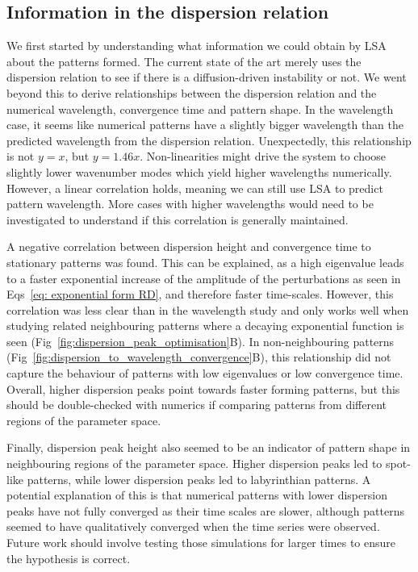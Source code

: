 \subsection*{Information in the dispersion relation}
We first started by understanding what information we could obtain by LSA about the patterns formed.
The current state of the art merely uses the dispersion relation to see if there is a diffusion-driven instability or not.
We went beyond this to derive relationships between the dispersion relation and the numerical wavelength, convergence time and pattern shape.
In the wavelength case, it seems like numerical patterns have a slightly bigger wavelength than the predicted wavelength from the dispersion relation.
Unexpectedly, this relationship is not $y=x$, but $y=1.46x$.
Non-linearities might drive the system to choose slightly lower wavenumber modes which yield higher wavelengths numerically.
However, a linear correlation holds, meaning we can still use LSA to predict pattern wavelength.
More cases with higher wavelengths would need to be investigated to understand if this correlation is generally maintained.

A negative correlation between dispersion height and convergence time to stationary patterns was found.
This can be explained, as a high eigenvalue leads to a faster exponential increase of the amplitude of the perturbations as seen in Eqs~\ref{eq: exponential form RD}, and therefore faster time-scales.
However, this correlation was less clear than in the wavelength study and only works well when studying related neighbouring patterns where a decaying exponential function is seen (Fig~\ref{fig:dispersion_peak_optimisation}B).
In non-neighbouring patterns (Fig~\ref{fig:dispersion_to_wavelength_convergence}B), this relationship did not capture the behaviour of patterns with low eigenvalues or low convergence time.
Overall, higher dispersion peaks point towards faster forming patterns, but this should be double-checked with numerics if comparing patterns from different regions of the parameter space.

Finally, dispersion peak height also seemed to be an indicator of pattern shape in neighbouring regions of the parameter space.
Higher dispersion peaks led to spot-like patterns, while lower dispersion peaks led to labyrinthian patterns.
A potential explanation of this is that numerical patterns with lower dispersion peaks have not fully converged as their time scales are slower, although patterns seemed to have qualitatively converged when the time series were observed.
Future work should involve testing those simulations for larger times to ensure the hypothesis is correct.



